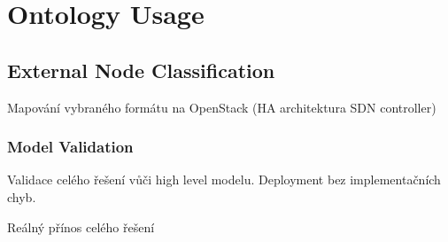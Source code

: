 
\section{Ontology Usage}

\subsection{External Node Classification}

Mapování vybraného formátu na OpenStack (HA architektura SDN controller)

\subsubsection{Model Validation}

Validace celého řešení vůči high level modelu. Deployment bez implementačních chyb.

Reálný přínos celého řešení
